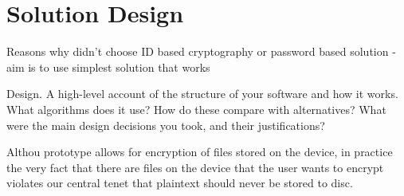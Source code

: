 
\chapter{Solution Design}
\label{cha:sol-des}
Reasons why didn't choose ID based cryptography or password based solution - aim is to use simplest solution that works

Design. A high-level account of the structure of your software and how it works. What algorithms does it use? How do these compare with alternatives? What were the main design decisions you took, and their justifications? 

Althou prototype allows for encryption of files stored on the device, in practice the very fact that there are files on the device that the user wants to encrypt violates our central tenet that plaintext should never be stored to disc. 
